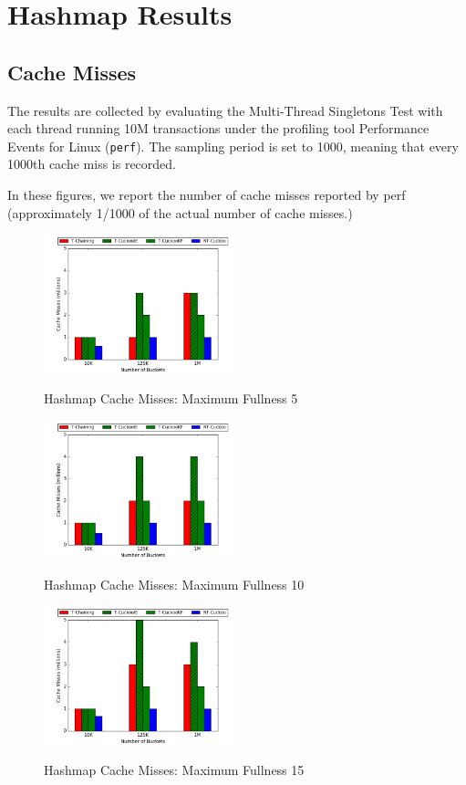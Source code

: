 \chapter{Hashmap Results}

\section{Cache Misses}

The results are collected by evaluating the Multi-Thread Singletons Test with each thread running 10M transactions under the profiling tool Performance Events for Linux (\texttt{perf}). The sampling period is set to 1000, meaning that every 1000th cache miss is recorded.

In these figures, we report the number of cache misses reported by perf (approximately 1/1000 of the actual number of cache misses.)

    \begin{figure}[H]
    \centering
        {\includegraphics[width=0.5\textwidth]{maps/5cm.png}}
        \caption{Hashmap Cache Misses: Maximum Fullness 5}
    \end{figure}

    \begin{figure}[H]
    \centering
        {\includegraphics[width=0.5\textwidth]{maps/10cm.png}}
        \caption{Hashmap Cache Misses: Maximum Fullness 10}
    \end{figure}

    \begin{figure}[H]
    \centering
        {\includegraphics[width=0.5\textwidth]{maps/15cm.png}}
        \caption{Hashmap Cache Misses: Maximum Fullness 15}
    \end{figure}


